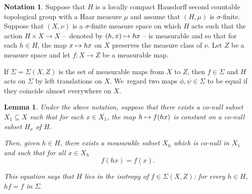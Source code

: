 \documentclass[10pt,a4paper]{amsart}
\def\mto{\mathchoice{\longmapsto}{\mapsto}{\mapsto}{\mapsto}}
\newtheorem{lemma}{Lemma}
\theoremstyle{definition}
\newtheorem{notation}{Notation}
\begin{document}
\begin{notation} Suppose that $H$ is a locally compact Hausdorff
second countable topological group with a Haar measure $\mu$ and assume that
$(H,\mu)$ is $\sigma$-finite. Suppose that $(X,\nu)$ is a
$\sigma$-finite measure space on which $H$ acts such that the action
\hbox{$H\times X\!\to\! X$} --~denoted by $(h,x)\mto hx$ -- is measurable and so
that for each $h\in H$, the map $x\mto hx$ on $X$ preserves the
measure class of $\nu $. Let $Z$ be a measure space and let $f:X\to Z$ be
a measurable map.

If $\Sigma =\Sigma (X,Z)$ is the set of measurable maps from $X$ to $Z$, then $f\in \Sigma$ and $H$ acts on $\Sigma$ by left translations on $X$. We~regard two maps $\phi, \psi \in \Sigma$ to be equal if they coincide almost everywhere on $X$.

\end{notation}

\begin{lemma}\label{almostall} Under the above notation, suppose that there exists a co-null subset $X_1\subseteq X$ such that for each $x\in X_1$, the map $h\mto f(hx)$ is constant on a co-null subset $H_x$ of $H$.

Then, given $h\in H$, there exists a measurable subset $X_h$ which is co-null in $X_1$ and such that for all $x\in X_h$
\[
f(hx)= f(x).
\]

This equation says that $H$ lies in the isotropy of $f \in \Sigma (X,Z)$: for every $h\in H$, $hf=f$ in $\Sigma$.
\end{lemma}
\end{document}
